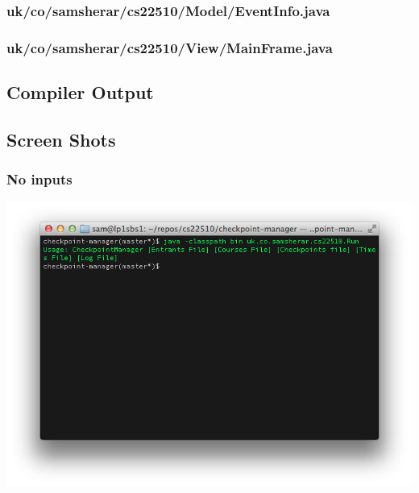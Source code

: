 \documentclass[10pt, a4paper]{article}
\begin{document}
\subsubsection{uk/co/samsherar/cs22510/Model/EventInfo.java}


\subsubsection{uk/co/samsherar/cs22510/View/MainFrame.java}



\subsection{Compiler Output}


\subsection{Screen Shots}

\subsubsection{No inputs}
\begin{center}
\includegraphics[width=\textwidth]{./screenshots/no-values.png}
\end{center}
\end{document}

